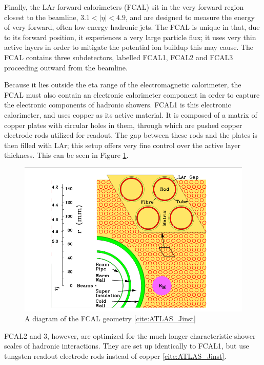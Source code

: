 Finally, the LAr forward calorimeters (FCAL) sit in the very forward region closest to the beamline, $3.1<|\eta |< 4.9$, and are designed to measure the energy of very forward, often low-energy hadronic jets.  The FCAL is unique in that, due to its forward position, it experiences a very large particle flux; it uses very thin active layers in order to mitigate the potential ion buildup this may cause.  The FCAL contains three subdetectors, labelled FCAL1, FCAL2 and FCAL3 proceeding outward from the beamline.

Because it lies outside the eta range of the electromagnetic calorimeter, the FCAL must also contain an electronic calorimeter component in order to capture the electronic components of hadronic showers. FCAL1 is this electronic calorimeter, and uses copper as its active material. It is composed of a matrix of copper plates with circular holes in them, through which are pushed copper electrode rods utilized for readout. The gap between these rods and the plates is then filled with LAr; this setup offers very fine control over the active layer thickness. This can be seen in Figure \ref{fig:FCAL}.

\begin{figure}
  \includegraphics[width=\linewidth]{figures/detector_chapter/FCAL.png}
  \caption{A diagram of the FCAL geometry \ref{cite:ATLAS_Jinst}}
  \label{fig:FCAL}
\end{figure}


FCAL2 and 3, however, are optimized for the much longer characteristic shower scales of hadronic interactions. They are set up identically to FCAL1, but use tungsten readout electrode rods instead of copper \ref{cite:ATLAS_Jinst}.

